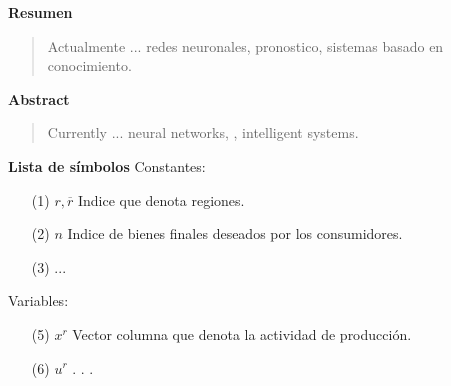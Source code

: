 \newpage
\begin{center}
 {\bf\LARGE Resumen}
\end{center} 
\vskip 0.5cm
\begin{quotation}
Actualmente ...
\vskip 0.3cm
\hspace*{-0.6cm}{\bf Palabras claves:} redes neuronales, pronostico, sistemas basado en conocimiento.
\end{quotation}


\newpage
\begin{center}
 {\bf\LARGE Abstract}\vskip 1.5cm
\end{center} 
\begin{quotation}
Currently ...
\vskip 0.3cm
\hspace*{-0.6cm}{\bf Keywords:} neural networks, , intelligent systems.
\end{quotation}


\newpage
{}
 {\bf\LARGE Lista de símbolos}
 \vskip 1.5cm
Constantes: 
\begin{enumerate}
\item[(1)]$r,\overline{r} $ \hspace*{0.8cm} Indice que denota regiones.
\item[(2)] $n $ \hspace*{1.1cm} Indice de bienes finales deseados por los consumidores.
\item[(3)] ...
\vskip 3cm
\end{enumerate} 
\vskip 0.3cm
Variables:
\begin{enumerate}
\item[(5)] $ x^{r} $ \hspace*{1cm} Vector columna que denota la actividad de producción.
\item[(6)] $ u^{r} $ \hspace*{1.2cm} . . .
\end{enumerate}


